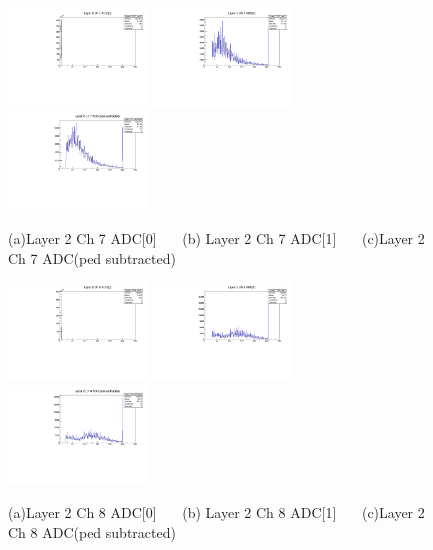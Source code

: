 \documentclass[a4paper,11pt]{article}
\theoremstyle{mytheor}
\begin{document}
\begin{figure}[H] 
\vspace*{-0.3cm} 
\includegraphics[width=0.33\textwidth,scale=0.5,trim=0 0 0 0,clip]{plotsdir/file0_test-Layer2_Ch7_adc0-1.pdf} 
\includegraphics[width=0.33\textwidth,scale=0.5,trim=0 0 0 0,clip]{plotsdir/file0_test-Layer2_Ch7_adc1-1.pdf} 
\includegraphics[width=0.33\textwidth,scale=0.5,trim=0 0 0 0,clip]{plotsdir/file0_test-Layer2_Ch7_adcPedsub-1.pdf} 
\caption{(a)Layer 2 Ch 7 ADC[0] ~~~(b) Layer 2 Ch 7 ADC[1] ~~~(c)Layer 2 Ch 7 ADC(ped subtracted) } 
\end{figure} 
\begin{figure}[H] 
\vspace*{-0.3cm} 
\includegraphics[width=0.33\textwidth,scale=0.5,trim=0 0 0 0,clip]{plotsdir/file0_test-Layer2_Ch8_adc0-1.pdf} 
\includegraphics[width=0.33\textwidth,scale=0.5,trim=0 0 0 0,clip]{plotsdir/file0_test-Layer2_Ch8_adc1-1.pdf} 
\includegraphics[width=0.33\textwidth,scale=0.5,trim=0 0 0 0,clip]{plotsdir/file0_test-Layer2_Ch8_adcPedsub-1.pdf} 
\caption{(a)Layer 2 Ch 8 ADC[0] ~~~(b) Layer 2 Ch 8 ADC[1] ~~~(c)Layer 2 Ch 8 ADC(ped subtracted) } 
\end{figure} 
\end{document}
